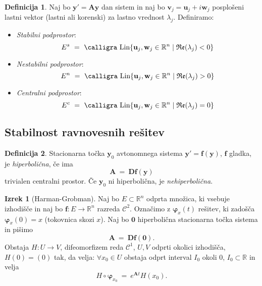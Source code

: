 \documentclass[11pt]{article}
\newcommand{\R}{\mathbb{R}}
\newcommand{\f}{\mathbf{f}}
\newcommand{\y}{\mathbf{y}}
\newcommand{\uu}{\mathbf{u}}
\newcommand{\vv}{\mathbf{v}}
\newcommand{\w}{\mathbf{w}}
\newcommand{\A}{\mathbf{A}}
\newcommand{\C}{\mathcal{C}}
\newcommand{\set}[1]{\{#1\}}
\newcommand{\re}{\mathfrak{Re}}
\newcommand{\Lin}{\text{\calligra Lin}}
\newcommand{\0}{\mathbf{0}}
\theoremstyle{definition}
\newtheorem{definicija}{Definicija}[section]
\theoremstyle{definition}
\theoremstyle{definition}
\newtheorem{izrek}{Izrek}[section]
\theoremstyle{definition}
\begin{document}
\begin{definicija}

Naj bo $\y' = \A\y$ dan sistem in naj bo $\vv_j = \uu_j + i\w_j$ posplošeni lastni vektor (lastni ali korenski) za lastno vrednost $\lambda_j$. Definiramo:
\begin{itemize}

\item \textit{Stabilni podprostor}:
$$E^s ~=~ \Lin\set{\uu_j, \w_j \in \R^n \mid \re(\lambda_j)<0}$$

\item \textit{Nestabilni podprostor}:
$$E^n ~=~ \Lin\set{\uu_j, \w_j \in \R^n \mid \re(\lambda_j)>0}$$

\item \textit{Centralni podprostor}:
$$E^c ~=~ \Lin\set{\uu_j, \w_j \in \R^n \mid \re(\lambda_j)=0}$$

\end{itemize}

\end{definicija}
\vspace{0.5cm}


\subsection{Stabilnost ravnovesnih rešitev}
\vspace{0.5cm}

\begin{definicija}

Stacionarna točka $\y_0$ avtonomnega sistema $\y' = \f(\y)$, $\f$ gladka, je \textit{hiperbolična}, če ima
$$\A ~=~ \mathbf{D}\f(\y)$$
trivialen centralni prostor. Če $\y_0$ ni hiperbolična, je \textit{nehiperbolična}.

\end{definicija}
\vspace{0.5cm}

\begin{izrek}[Harman-Grobman]

Naj bo $E \subset \R^n$ odprta množica, ki vsebuje izhodišče in naj bo $\f: E \rightarrow \R^n$ razreda $\C^2$. Označimo z $\bm{\varphi}_x(t)$ rešitev, ki zadošča $\bm{\varphi}_x(0) = x$ (tokovnica skozi $x$). Naj bo $\0$ hiperbolična stacionarna točka sistema in pišimo
$$\A ~=~ \mathbf{D}\f(\0).$$
Obstaja $H: U \rightarrow V$, difeomorfizem reda $\C^1$, $U,V$ odprti okolici izhodišča, $H(0)=(0)$ tak, da velja: $\forall x_0 \in U$ obstaja odprt interval $I_0$ okoli $0$, $I_0 \subset \R$ in velja
$$H \circ \bm{\varphi}_{x_0} ~=~ e^{\A t} H(x_0).$$

\end{izrek}
\vspace{0.5cm}
\end{document}
